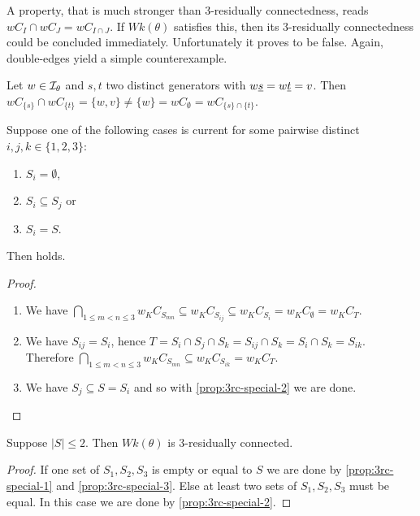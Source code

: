 A property, that is much stronger than 3-residually connectedness, reads $wC_I \cap wC_J = wC_{I \cap J}$. If $Wk(\theta)$ satisfies this, then its 3-residually connectedness could be concluded immediately. Unfortunately it proves to be false. Again, double-edges yield a simple counterexample.

\begin{exam}
	Let $w \in \mathcal{I}_{\theta}$ and $s,t$ two distinct generators with $w \underline{s} = w \underline{t} = v$. Then $wC_{\{s\}} \cap wC_{\{t\}} = \{w,v\} \neq \{w\} = wC_{\emptyset} = wC_{\{s\} \cap \{t\}}$.
\end{exam}

\begin{prop}
	Suppose one of the following cases is current for some pairwise distinct $i,j,k \in \{1,2,3\}$:
	\begin{enumerate}
		\item \label{prop:3rc-special-1} $S_i = \emptyset$,
		\item \label{prop:3rc-special-2} $S_i \subseteq S_j$ or
		\item \label{prop:3rc-special-3} $S_i = S$.
	\end{enumerate}
	Then  holds.

	\begin{proof}
		\begin{enumerate}
			\item We have $\bigcap_{1 \leq m < n \leq 3} w_K C_{S_{mn}} \subseteq w_K C_{S_{ij}} \subseteq w_K C_{S_{i}} = w_K C_\emptyset = w_K C_T$.
			\item We have $S_{ij} = S_i$, hence $T = S_i \cap S_j \cap S_k = S_{ij} \cap S_k = S_i \cap S_k = S_{ik}$. Therefore $\bigcap_{1 \leq m < n \leq 3} w_K C_{S_{mn}} \subseteq w_K C_{S_{ik}} = w_K C_T$.
			\item We have $S_j \subseteq S = S_i$ and so with \ref{prop:3rc-special-2} we are done. \qedhere
		\end{enumerate}
	\end{proof}
\end{prop}

\begin{coro}
	Suppose $|S| \leq 2$. Then $Wk(\theta)$ is 3-residually connected.

	\begin{proof}
		If one set of $S_1,S_2,S_3$ is empty or equal to $S$ we are done by \ref{prop:3rc-special-1} and \ref{prop:3rc-special-3}. Else at least two sets of $S_1,S_2,S_3$ must be equal. In this case we are done by \ref{prop:3rc-special-2}.
	\end{proof}
\end{coro}